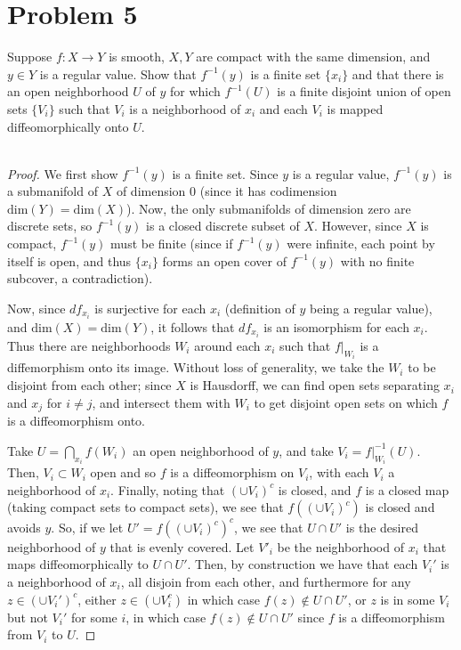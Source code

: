 \documentclass[fontsize=11pt]{scrartcl} %
\numberwithin{equation}{section} %
\numberwithin{figure}{section} %
\numberwithin{table}{section} %
\begin{document}
\section*{Problem 5}
Suppose $f:X\to Y$ is smooth, $X,Y$ are compact with the same dimension, and
$y\in Y$ is a regular value.
Show that $f^{-1}(y)$ is a finite set $\{x_i\}$ and that there is an open
neighborhood $U$ of $y$ for which $f^{-1}(U)$ is a finite disjoint union of open
sets $\{V_i\}$ such that $V_i$ is a neighborhood of $x_i$ and each $V_i$ is
mapped diffeomorphically onto $U$.
\\
\\
\begin{proof}
    We first show $f^{-1}(y)$ is a finite set. Since $y$ is a regular value,
    $f^{-1}(y)$ is a submanifold of $X$ of dimension $0$ (since it has
    codimension $\text{dim}(Y) = \text{dim}(X)$). Now, the only submanifolds of
    dimension zero are discrete sets, so $f^{-1}(y)$ is a closed discrete subset
    of $X$. However, since $X$ is compact, $f^{-1}(y)$ must be finite (since if
        $f^{-1}(y)$ were infinite, each point by itself is open, and thus
        $\{x_i\}$ forms an open cover of $f^{-1}(y)$ with no finite subcover, a
    contradiction).

    Now, since $df_{x_i}$ is surjective for each $x_i$ (definition of $y$ being
    a regular value), and $\text{dim}(X) = \text{dim}(Y)$, it follows that
    $df_{x_i}$ is an isomorphism for each $x_i$. Thus there are neighborhoods
    $W_i$ around each $x_i$ such that $f|_{W_i}$ is a diffemorphism onto its
    image. Without loss of generality, we take the $W_i$ to be disjoint from
    each other; since $X$ is Hausdorff, we can find open sets separating $x_i$
    and $x_j$ for $i\neq j$, and intersect them with $W_i$ to get disjoint open
    sets on which $f$ is a diffeomorphism onto.

    Take $U = \bigcap_{x_i}f(W_i)$ an open neighborhood of $y$, and take $V_i =
    f|_{W_i}^{-1}(U)$. Then, $V_i\subset W_i$ open and so $f$ is a
    diffeomorphism on $V_i$, with each $V_i$ a neighborhood of $x_i$. Finally,
    noting that $(\cup V_i)^c$ is closed, and $f$ is a closed map (taking
compact sets to compact sets), we see that $f((\cup V_i)^c)$ is closed and
avoids $y$. So, if we let $U' = f((\cup V_i)^c)^c$, we see that $U\cap U'$ is
the desired neighborhood of $y$ that is evenly covered. Let $V'_i$ be the
neighborhood of $x_i$ that maps diffeomorphically to $U\cap U'$. Then, by
construction we have that each $V_i'$ is a neighborhood of $x_i$, all disjoin
from each other, and furthermore for any $z\in (\cup V_i')^c$, either $z\in
(\cup V_i^c)$ in which case $f(z)\not\in U\cap U'$, or $z$ is in some $V_i$ but
not $V_i'$ for some $i$, in which case $f(z)\not\in U\cap U'$ since $f$ is a
diffeomorphism from $V_i$ to $U$.
\end{proof}
\end{document}
